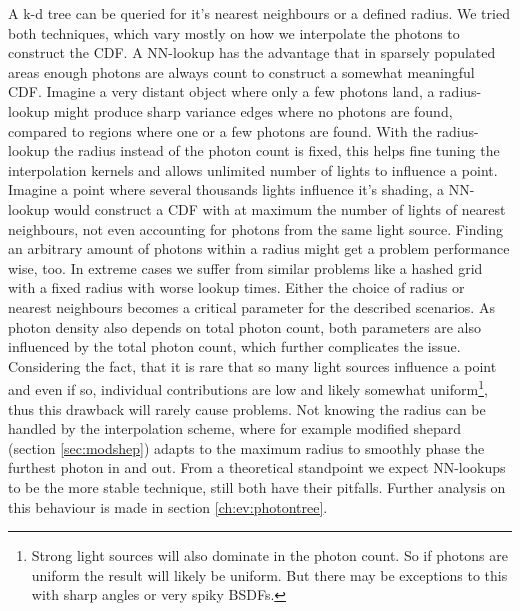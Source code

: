 A k-d tree can be queried for it's nearest neighbours or a defined radius. We tried both techniques, which vary mostly on how we interpolate the photons to construct the CDF. A NN-lookup has the advantage that in sparsely populated areas enough photons are always count to construct a somewhat meaningful CDF. Imagine a very distant object where only a few photons land, a radius-lookup might produce sharp variance edges where no photons are found, compared to regions where one or a few photons are found. With the radius-lookup the radius instead of the photon count is fixed, this helps fine tuning the interpolation kernels and allows unlimited number of lights to influence a point. Imagine a point where several thousands lights influence it's shading, a NN-lookup would construct a CDF with at maximum the number of lights of nearest neighbours, not even accounting for photons from the same light source. Finding an arbitrary amount of photons within a radius might get a problem performance wise, too. In extreme cases we suffer from similar problems like a hashed grid with a fixed radius with worse lookup times. Either the choice of radius or nearest neighbours becomes a critical parameter for the described scenarios. As photon density also depends on total photon count, both parameters are also influenced by the total photon count, which further complicates the issue. Considering the fact, that it is rare that so many light sources influence a point and even if so, individual contributions are low and likely somewhat uniform\footnote{Strong light sources will also dominate in the photon count. So if photons are uniform the result will likely be uniform. But there may be exceptions to this with sharp angles or very spiky BSDFs.}, thus this drawback will rarely cause problems. Not knowing the radius can be handled by the interpolation scheme, where for example modified shepard (section \ref{sec:modshep}) adapts to the maximum radius to smoothly phase the furthest photon in and out. From a theoretical standpoint we expect NN-lookups to be the more stable technique, still both have their pitfalls. Further analysis on this behaviour is made in section \ref{ch:ev:photontree}.

